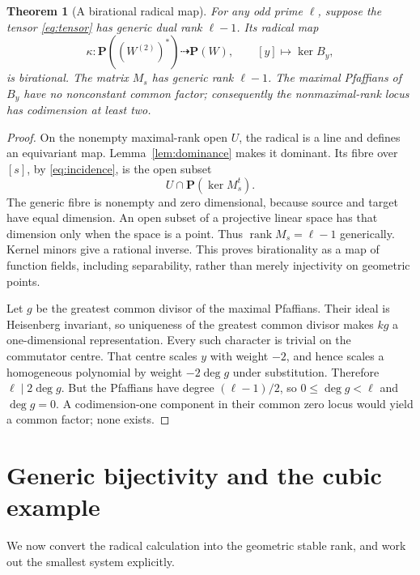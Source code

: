 \documentclass[11pt]{article}
\newtheorem{theorem}{Theorem}[section]
\theoremstyle{definition}\newtheorem{definition}[theorem]{Definition}
\theoremstyle{remark}\newtheorem{remark}[theorem]{Remark}
\newcommand{\PP}{\mathbf P}
\newcommand{\rk}{\operatorname{rank}}
\begin{document}
\begin{theorem}[A birational radical map]\label{thm:birational}
For any odd prime $\ell$, suppose the tensor \eqref{eq:tensor} has generic dual rank $\ell-1$. Its radical map
\[
 \kappa:\PP((W^{(2)})^*)\dashrightarrow\PP(W),
 \qquad [y]\longmapsto\ker B_y,
\]
is birational. The matrix $M_s$ has generic rank $\ell-1$. The maximal Pfaffians of $B_y$ have no nonconstant common factor; consequently the nonmaximal-rank locus has codimension at least two.
\end{theorem}
\begin{proof}
On the nonempty maximal-rank open $U$, the radical is a line and defines an equivariant map. Lemma~\ref{lem:dominance} makes it dominant. Its fibre over $[s]$, by \eqref{eq:incidence}, is the open subset
\[
 U\cap\PP(\ker M_s^t).
\]
The generic fibre is nonempty and zero dimensional, because source and target have equal dimension. An open subset of a projective linear space has that dimension only when the space is a point. Thus $\rk M_s=\ell-1$ generically. Kernel minors give a rational inverse. This proves birationality as a map of function fields, including separability, rather than merely injectivity on geometric points.

Let $g$ be the greatest common divisor of the maximal Pfaffians. Their ideal is Heisenberg invariant, so uniqueness of the greatest common divisor makes $kg$ a one-dimensional representation. Every such character is trivial on the commutator centre. That centre scales $y$ with weight $-2$, and hence scales a homogeneous polynomial by weight $-2\deg g$ under substitution. Therefore $\ell\mid2\deg g$. But the Pfaffians have degree $(\ell-1)/2$, so $0\le\deg g<\ell$ and $\deg g=0$. A codimension-one component in their common zero locus would yield a common factor; none exists.
\end{proof}

\section{Generic bijectivity and the cubic example}\label{sec:conclusion}

We now convert the radical calculation into the geometric stable rank, and work out the smallest system explicitly.
\end{document}
